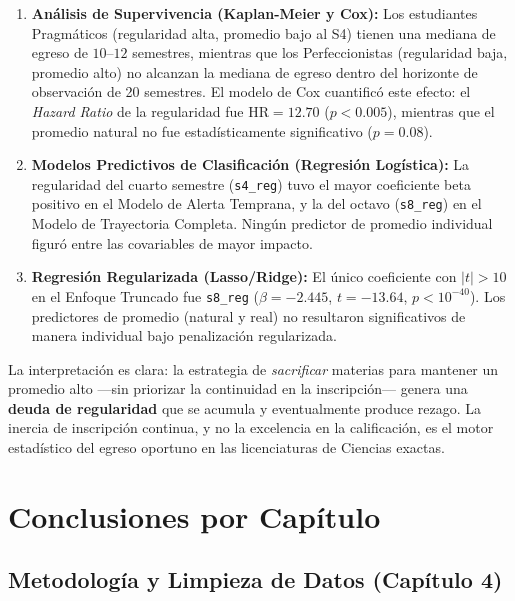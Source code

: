 \begin{enumerate}
    \item \textbf{Análisis de Supervivencia (Kaplan-Meier y Cox):} Los estudiantes Pragmáticos
          (regularidad alta, promedio bajo al S4) tienen una mediana de egreso de
          $10$--$12$ semestres, mientras que los Perfeccionistas (regularidad baja, promedio alto)
          no alcanzan la mediana de egreso dentro del horizonte de observación de 20 semestres.
          El modelo de Cox cuantificó este efecto: el \emph{Hazard Ratio} de la regularidad
          fue $\text{HR} = 12.70$ ($p < 0.005$), mientras que el promedio natural no fue
          estadísticamente significativo ($p = 0.08$).

    \item \textbf{Modelos Predictivos de Clasificación (Regresión Logística):} La regularidad del
          cuarto semestre (\texttt{s4\_reg}) tuvo el mayor coeficiente beta positivo en el Modelo
          de Alerta Temprana, y la del octavo (\texttt{s8\_reg}) en el Modelo de Trayectoria
          Completa. Ningún predictor de promedio individual figuró entre las covariables de mayor impacto.

    \item \textbf{Regresión Regularizada (Lasso/Ridge):} El único coeficiente con $|t| > 10$
          en el Enfoque Truncado fue \texttt{s8\_reg} ($\beta = -2.445$, $t = -13.64$,
          $p < 10^{-40}$). Los predictores de promedio (natural y real) no resultaron
          significativos de manera individual bajo penalización regularizada.
\end{enumerate}

\noindent
La interpretación es clara: la estrategia de \emph{sacrificar} materias para mantener un
promedio alto —sin priorizar la continuidad en la inscripción— genera una \textbf{deuda de
regularidad} que se acumula y eventualmente produce rezago. La inercia de inscripción
continua, y no la excelencia en la calificación, es el motor estadístico del egreso oportuno
en las licenciaturas de Ciencias exactas.

\section{Conclusiones por Capítulo}

\subsection{Metodología y Limpieza de Datos (Capítulo 4)}


